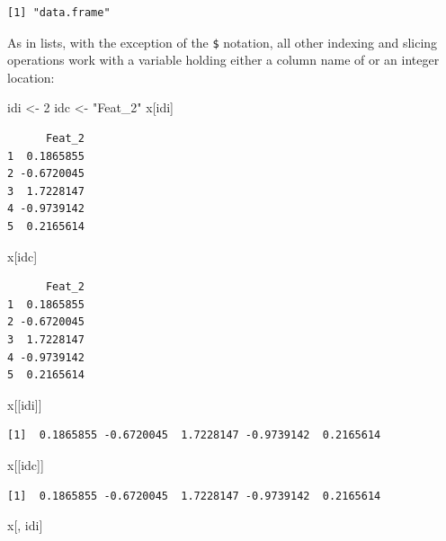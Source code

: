 \documentclass[
]{book}
\newenvironment{Shaded}{\begin{snugshade}}{\end{snugshade}}
\newcommand{\DecValTok}[1]{\textcolor[rgb]{0.00,0.00,0.81}{#1}}
\newcommand{\NormalTok}[1]{#1}
\newcommand{\OtherTok}[1]{\textcolor[rgb]{0.56,0.35,0.01}{#1}}
\newcommand{\StringTok}[1]{\textcolor[rgb]{0.31,0.60,0.02}{#1}}
\begin{document}
\begin{verbatim}
[1] "data.frame"
\end{verbatim}

As in lists, with the exception of the \texttt{\$} notation, all other indexing and slicing operations work with a variable holding either a column name of or an integer location:

\begin{Shaded}
\begin{Highlighting}[]
\NormalTok{idi }\OtherTok{\textless{}{-}} \DecValTok{2}
\NormalTok{idc }\OtherTok{\textless{}{-}} \StringTok{"Feat\_2"}
\NormalTok{x[idi]}
\end{Highlighting}
\end{Shaded}

\begin{verbatim}
      Feat_2
1  0.1865855
2 -0.6720045
3  1.7228147
4 -0.9739142
5  0.2165614
\end{verbatim}

\begin{Shaded}
\begin{Highlighting}[]
\NormalTok{x[idc]}
\end{Highlighting}
\end{Shaded}

\begin{verbatim}
      Feat_2
1  0.1865855
2 -0.6720045
3  1.7228147
4 -0.9739142
5  0.2165614
\end{verbatim}

\begin{Shaded}
\begin{Highlighting}[]
\NormalTok{x[[idi]]}
\end{Highlighting}
\end{Shaded}

\begin{verbatim}
[1]  0.1865855 -0.6720045  1.7228147 -0.9739142  0.2165614
\end{verbatim}

\begin{Shaded}
\begin{Highlighting}[]
\NormalTok{x[[idc]]}
\end{Highlighting}
\end{Shaded}

\begin{verbatim}
[1]  0.1865855 -0.6720045  1.7228147 -0.9739142  0.2165614
\end{verbatim}

\begin{Shaded}
\begin{Highlighting}[]
\NormalTok{x[, idi]}
\end{Highlighting}
\end{Shaded}
\end{document}
